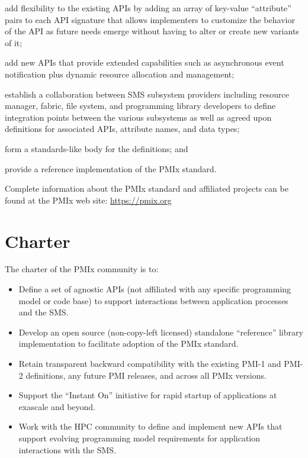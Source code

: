\begin{compactalphaenum}
\item add flexibility to the existing \acp{API} by adding an array of key-value ``attribute'' pairs to each \ac{API} signature that allows implementers to customize the behavior of the \ac{API} as future needs emerge without having to alter or create new variants of it;

\item add new APIs that provide extended capabilities such as asynchronous event notification plus dynamic resource allocation and management;

\item establish a collaboration between \ac{SMS} subsystem providers including resource manager, fabric, file system, and programming library developers to define integration points between the various subsystems as well as agreed upon definitions for associated \acp{API}, attribute names, and data types;

\item form a standards-like body for the definitions; and

\item provide a reference implementation of the \ac{PMIx} standard.
\end{compactalphaenum}

Complete information about the \ac{PMIx} standard and affiliated projects can be found at the \ac{PMIx} web site: \url{https://pmix.org}


\section{Charter}
\label{chap:intro:charter}

The charter of the PMIx community is to:
\begin{itemize}
\item Define a set of agnostic APIs (not affiliated with any specific programming model or code base) to support interactions between application processes and the \ac{SMS}.
\item Develop an open source (non-copy-left licensed) standalone ``reference'' library implementation to facilitate adoption of the \ac{PMIx} standard.
\item Retain transparent backward compatibility with the existing PMI-1 and PMI-2 definitions, any future \ac{PMI} releases, and across all \ac{PMIx} versions.
\item Support the ``Instant On'' initiative for rapid startup of applications at exascale and beyond.
\item Work with the \ac{HPC} community to define and implement new \acp{API} that support evolving programming model requirements for application interactions with the \ac{SMS}.
\end{itemize}


